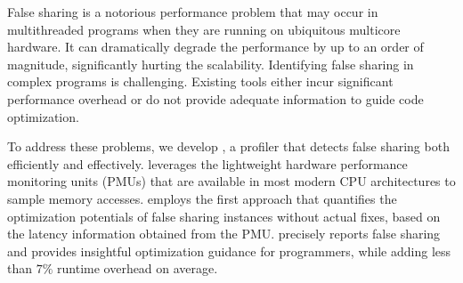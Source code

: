 
False sharing is a notorious performance problem that may occur in multithreaded programs when they are running on ubiquitous multicore hardware. It can dramatically degrade the performance by up to an order of magnitude, significantly hurting the scalability. Identifying false sharing in complex programs is challenging. Existing tools either incur significant performance overhead or do not provide adequate information to guide code optimization.

\sloppy
To address these problems, we develop \cheetah{}, a profiler that detects false sharing both efficiently and effectively. \cheetah{} leverages the lightweight hardware performance monitoring units (PMUs) that are available in most modern CPU architectures to sample memory accesses. \cheetah{} employs the first approach that quantifies the optimization potentials of  false sharing instances without actual fixes, based on the latency information obtained from the PMU. \cheetah{} precisely reports false sharing and provides insightful optimization guidance for programmers, while adding less than $7\%$ runtime overhead on average. %

